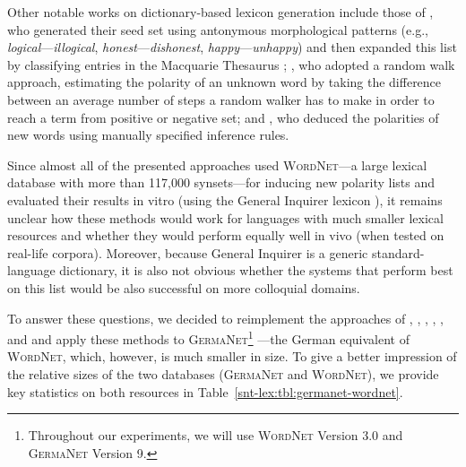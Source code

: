 Other notable works on dictionary-based lexicon generation include
those of \citet{Mohammad:09}, who generated their seed set using
antonymous morphological patterns (e.g.,
\emph{logical}---\emph{illogical}, \emph{honest}---\emph{dishonest},
\emph{happy}---\emph{unhappy}) and then expanded this list by
classifying entries in the Macquarie Thesaurus \cite{Bernard:86};
\citet{Hassan:10}, who adopted a random walk approach, estimating the
polarity of an unknown word by taking the difference between an
average number of steps a random walker has to make in order to reach
a term from positive or negative set; and \citet{Dragut:10}, who
deduced the polarities of new words using manually specified inference
rules.

Since almost all of the presented approaches used \textsc{WordNet}---a
large lexical database with more than 117,000 synsets---for inducing
new polarity lists and evaluated their results in vitro (using the
General Inquirer lexicon \cite{Stone:66}), it remains unclear how
these methods would work for languages with much smaller lexical
resources and whether they would perform equally well in vivo (when
tested on real-life corpora).  Moreover, because General Inquirer is a
generic standard-language dictionary, it is also not obvious whether
the systems that perform best on this list would be also successful on
more colloquial domains.

To answer these questions, we decided to reimplement the approaches of
\citet{Hu:04}, \citet{Blair-Goldensohn:08}, \citet{Kim:04,Kim:06},
\citet{Esuli:06c}, \citet{Rao:09}, and \citet{Hassan:10} and apply
these methods to \textsc{GermaNet}\footnote{Throughout our
  experiments, we will use \textsc{WordNet} Version 3.0 and
  \textsc{GermaNet} Version 9.} \cite{Hamp:97}---the German equivalent
of \textsc{WordNet}, which, however, is much smaller in size.  To give
a better impression of the relative sizes of the two databases
(\textsc{GermaNet} and \textsc{WordNet}), we provide key statistics on
both resources in Table~\ref{snt-lex:tbl:germanet-wordnet}.

